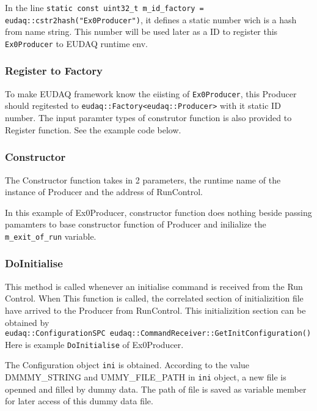 

In the line \lstinline[style=cpp]{static const uint32_t m_id_factory = eudaq::cstr2hash("Ex0Producer")}, it defines a static number wich is a hash from name string. This number will be used later as a ID to register this \lstinline[style=cpp]{Ex0Producer} to EUDAQ runtime env.

\subsubsection{Register to Factory}
To make EUDAQ framework know the eiisting of \lstinline[style=cpp]{Ex0Producer}, this Producer should regitested to \lstinline[style=cpp]{eudaq::Factory<eudaq::Producer>} with it static ID number. The input paramter types of construtor function is also provided to Register function. See the example code below.


\subsubsection{Constructor}
The Constructor function takes in 2 parameters, the runtime name of the instance of Producer and the address of RunControl. 

In this example of Ex0Producer, constructor function does nothing beside passing pamamters to base constructor function of Producer and inilialize the \lstinline[style=cpp]{m_exit_of_run} variable.

\subsubsection{DoInitialise}
This method is called whenever an initialise command is received from the Run Control. When This function is called, the correlated section of initializition file have arrived to the Producer from RunControl. This initializition section can be obtained by \\
\lstinline[style=cpp]{eudaq::ConfigurationSPC eudaq::CommandReceiver::GetInitConfiguration()} \\

Here is example \lstinline[style=cpp]{DoInitialise} of Ex0Producer.

The Configuration object \lstinline[style=cpp]{ini} is obtained. According to the value DMMMY\_STRING and UMMY\_FILE\_PATH in \lstinline[style=cpp]{ini} object, a new file is openned and filled by dummy data. The path of file is saved as variable member for later access of this dummy data file.

